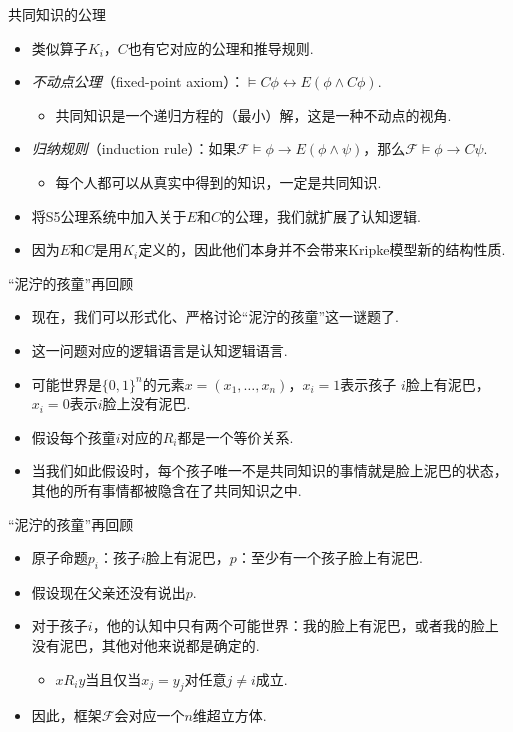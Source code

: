 \begin{frame}{共同知识的公理}
\begin{itemize}
    \item 类似算子$K_i$，$C$也有它对应的公理和推导规则.
    \item \emph{不动点公理}（fixed-point axiom）：$\vDash C\phi\leftrightarrow E(\phi\wedge C\phi)$.
    \begin{itemize}
        \item 共同知识是一个递归方程的（最小）解，这是一种不动点的视角.
    \end{itemize}
    \item \emph{归纳规则}（induction rule）：如果$\mathcal F\vDash \phi\to E(\phi\wedge\psi)$，那么$\mathcal  F\vDash \phi\to C\psi$.
    \begin{itemize}
        \item 每个人都可以从真实中得到的知识，一定是共同知识.
    \end{itemize}
    \item 将S5公理系统中加入关于$E$和$C$的公理，我们就扩展了认知逻辑. 
    \item 因为$E$和$C$是用$K_i$定义的，因此他们本身并不会带来Kripke模型新的结构性质.
\end{itemize}
\end{frame}

\begin{frame}{“泥泞的孩童”再回顾}
\begin{itemize}
    \item 现在，我们可以形式化、严格讨论“泥泞的孩童”这一谜题了.
    \item 这一问题对应的逻辑语言是认知逻辑语言.
    \item 可能世界是$\{0,1\}^n$的元素$x=(x_1,\dots,x_n)$，$x_i=1$表示孩子
    $i$脸上有泥巴，$x_i=0$表示$i$脸上没有泥巴.
    \item 假设每个孩童$i$对应的$R_i$都是一个等价关系.
    \item 当我们如此假设时，每个孩子唯一不是共同知识的事情就是脸上泥巴的状态，其他的所有事情都被隐含在了共同知识之中.
\end{itemize}
\end{frame}

\begin{frame}{“泥泞的孩童”再回顾}
\begin{itemize}
    \item 原子命题$p_i$：孩子$i$脸上有泥巴，$p$：至少有一个孩子脸上有泥巴.
    \item 假设现在父亲还没有说出$p$.
    \item 对于孩子$i$，他的认知中只有两个可能世界：我的脸上有泥巴，或者我的脸上没有泥巴，其他对他来说都是确定的.
    \begin{itemize}
        \item $x R_i y$当且仅当$x_j=y_j$对任意$j\neq i$成立.
    \end{itemize}
    \item 因此，框架$\mathcal F$会对应一个$n$维超立方体.
\end{itemize}
\end{frame}

